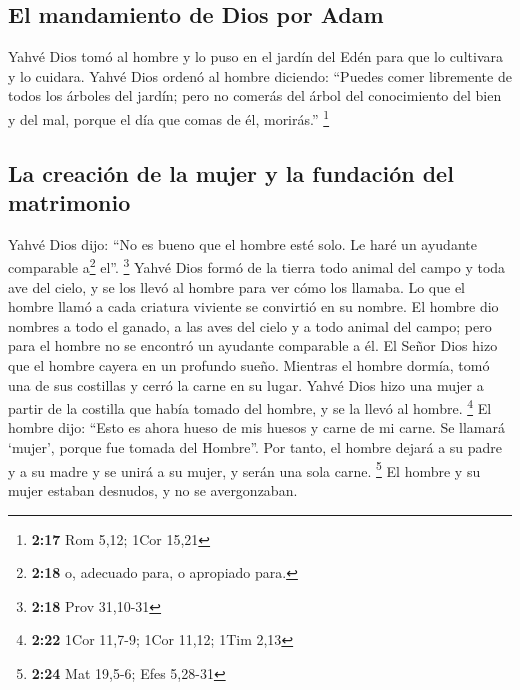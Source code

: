 \begin{paracol}{2}
\hypertarget{el-mandamiento-de-dios-por-adam}{%
\subsection{El mandamiento de Dios por
Adam}\label{el-mandamiento-de-dios-por-adam}}

 Yahvé Dios tomó al hombre y lo puso en el jardín del
Edén para que lo cultivara y lo cuidara.  Yahvé Dios
ordenó al hombre diciendo: ``Puedes comer libremente de todos los
árboles del jardín;  pero no comerás del árbol del
conocimiento del bien y del mal, porque el día que comas de él,
morirás.'' \footnote{\textbf{2:17} Rom 5,12; 1Cor 15,21}

\hypertarget{la-creaciuxf3n-de-la-mujer-y-la-fundaciuxf3n-del-matrimonio}{%
\subsection{La creación de la mujer y la fundación del
matrimonio}\label{la-creaciuxf3n-de-la-mujer-y-la-fundaciuxf3n-del-matrimonio}}

 Yahvé Dios dijo: ``No es bueno que el hombre esté solo.
Le haré un ayudante comparable a\footnote{\textbf{2:18} o, adecuado
  para, o apropiado para.} el''. \footnote{\textbf{2:18} Prov 31,10-31}
 Yahvé Dios formó de la tierra todo animal del campo y
toda ave del cielo, y se los llevó al hombre para ver cómo los llamaba.
Lo que el hombre llamó a cada criatura viviente se convirtió en su
nombre.  El hombre dio nombres a todo el ganado, a las
aves del cielo y a todo animal del campo; pero para el hombre no se
encontró un ayudante comparable a él.  El Señor Dios hizo
que el hombre cayera en un profundo sueño. Mientras el hombre dormía,
tomó una de sus costillas y cerró la carne en su lugar. 
Yahvé Dios hizo una mujer a partir de la costilla que había tomado del
hombre, y se la llevó al hombre. \footnote{\textbf{2:22} 1Cor 11,7-9;
  1Cor 11,12; 1Tim 2,13}  El hombre dijo: ``Esto es ahora
hueso de mis huesos y carne de mi carne. Se llamará `mujer', porque fue
tomada del Hombre''.  Por tanto, el hombre dejará a su
padre y a su madre y se unirá a su mujer, y serán una sola carne.
\footnote{\textbf{2:24} Mat 19,5-6; Efes 5,28-31}  El
hombre y su mujer estaban desnudos, y no se avergonzaban.

\switchcolumn
\begin{otherlanguage}{english}


\end{otherlanguage}
\end{paracol}
